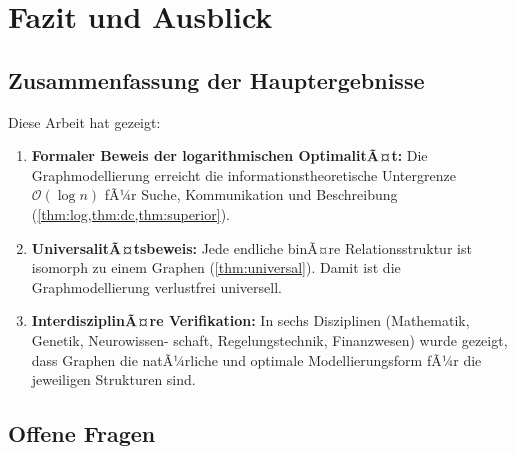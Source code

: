 ﻿\documentclass[12pt,a4paper,twoside]{article}
\theoremstyle{definition}
\theoremstyle{plain}
\theoremstyle{remark}
\begin{document}
\section{Fazit und Ausblick}
\label{sec:fazit}

\subsection{Zusammenfassung der Hauptergebnisse}

Diese Arbeit hat gezeigt:

\begin{enumerate}
  \item \textbf{Formaler Beweis der logarithmischen OptimalitÃ¤t:}
        Die Graphmodellierung erreicht die informationstheoretische
        Untergrenze $\mathcal{O}(\log n)$ fÃ¼r Suche, Kommunikation
        und Beschreibung (\cref{thm:log,thm:dc,thm:superior}).

  \item \textbf{UniversalitÃ¤tsbeweis:}
        Jede endliche binÃ¤re Relationsstruktur ist isomorph zu
        einem Graphen (\cref{thm:universal}).  Damit ist die
        Graphmodellierung verlustfrei universell.

  \item \textbf{InterdisziplinÃ¤re Verifikation:}
        In sechs Disziplinen (Mathematik, Genetik, Neuro\-wissen-
        schaft, Regelungstechnik, Finanzwesen) wurde gezeigt,
        dass Graphen die natÃ¼rliche und optimale Modellierungsform
        fÃ¼r die jeweiligen Strukturen sind.
\end{enumerate}

\subsection{Offene Fragen}
\end{document}

